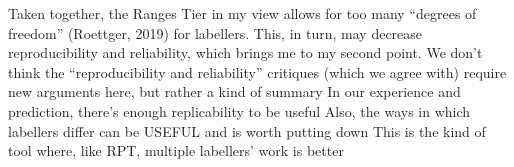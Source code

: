 \markdownRendererUlEndTight \markdownRendererUlItemEnd 
\markdownRendererUlItem Taken together, the Ranges Tier in my view allows for too many “degrees of freedom” (Roettger, 2019) for labellers. This, in turn, may decrease reproducibility and reliability, which brings me to my second point.\markdownRendererUlItemEnd 
\markdownRendererUlItem We don’t think the “reproducibility and reliability” critiques (which we agree with) require new arguments here, but rather a kind of summary\markdownRendererInterblockSeparator
{}\markdownRendererUlBeginTight
\markdownRendererUlItem In our experience and prediction, there’s enough replicability to be useful\markdownRendererUlItemEnd 
\markdownRendererUlItem Also, the ways in which labellers differ can be USEFUL and is worth putting down\markdownRendererUlItemEnd 
\markdownRendererUlItem This is the kind of tool where, like RPT, multiple labellers’ work is better\markdownRendererUlItemEnd 
\markdownRendererUlEndTight \markdownRendererUlItemEnd 
\markdownRendererUlEndTight 
\markdownRendererSectionEnd 
\markdownRendererSectionEnd 
\markdownRendererSectionEnd \markdownRendererDocumentEnd